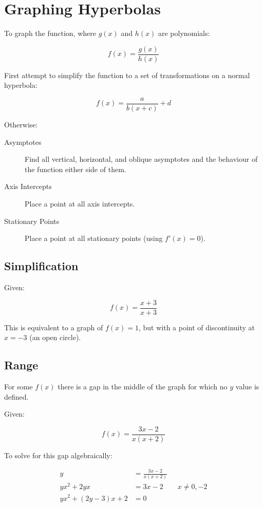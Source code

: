 \documentclass[a4paper,11pt]{article}
\begin{document}
\section{Graphing Hyperbolas}

To graph the function, where $g(x)$ and $h(x)$ are polynomials:

$$
f(x) = \frac{g(x)}{h(x)}
$$

First attempt to simplify the function to a set of transformations on a normal
hyperbola:

$$
f(x) = \frac{a}{b(x + c)} + d
$$

Otherwise:

\begin{description}
\item [Asymptotes] Find all vertical, horizontal, and oblique asymptotes and
	the behaviour of the function either side of them.
\item [Axis Intercepts] Place a point at all axis intercepts.
\item [Stationary Points] Place a point at all stationary points (using
	$f'(x) = 0$).
\end{description}


\subsection{Simplification}

Given:

$$
f(x) = \frac{x + 3}{x + 3}
$$

This is equivalent to a graph of $f(x) = 1$, but with a point of discontinuity
at $x = -3$ (an open circle).


\subsection{Range}

For some $f(x)$ there is a gap in the middle of the graph for which no $y$ value
is defined.

Given:

$$
f(x) = \frac{3x - 2}{x(x + 2)}
$$

To solve for this gap algebraically:

$$
\begin{aligned}
y & = \frac{3x - 2}{x(x + 2)} \\
yx^2 + 2yx & = 3x - 2 \qquad x \neq 0, -2 \\
yx^2 + (2y - 3)x + 2 & = 0 \\
\end{aligned}
$$
\end{document}
